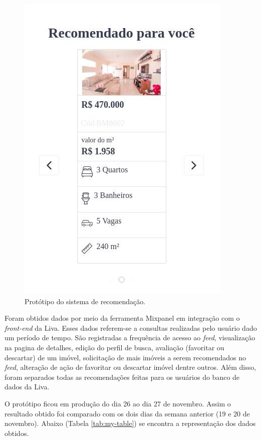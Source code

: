 \begin{apendicesenv}
\begin{figure}[H]
    \centering
    \includegraphics[scale=0.6]{figuras/consideracoes_finais/prototipo_simulacao_rs.jpg}
    \caption[Protótipo do sistema de recomendação]{Protótipo do sistema de recomendação.}
    \label{fig:prototipo_simulacao_rs}
\end{figure}

Foram obtidos dados por meio da ferramenta Mixpanel em integração com o \textit{front-end} da Liva. Esses dados referem-se a consultas realizadas pelo usuário dado um período de tempo. São registradas a frequência de acesso ao \textit{feed}, visualização na pagina de detalhes, edição do perfil de busca, avaliação (favoritar ou descartar) de um imóvel, solicitação de mais imóveis a serem recomendados no \textit{feed}, alteração de ação de favoritar ou descartar imóvel dentre outros. Além disso, foram separados todas as recomendações feitas para os usuários do banco de dados da Liva.

O protótipo ficou em produção do dia 26 ao dia 27 de novembro. Assim o resultado obtido foi comparado com os dois dias da semana anterior (19 e 20 de novembro). Abaixo (Tabela \ref{tab:my-table}) se encontra a representação dos dados obtidos.


\end{apendicesenv}
